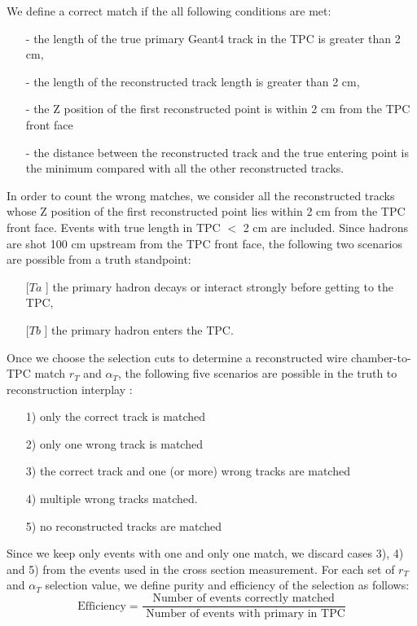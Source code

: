 We define a correct match if the all following conditions are met:
\begin{itemize}
\item[-] the length of the true primary Geant4 track in the TPC is greater than 2 cm,  
\item[-] the length of the reconstructed track length is greater than 2 cm,
\item[-] the Z position of the first reconstructed point is within 2 cm from the TPC front face
\item[-] the distance between the reconstructed track and the true entering point is the minimum compared with all the other reconstructed tracks.
\end{itemize}

In order to count the wrong matches, we consider all the reconstructed tracks whose Z position of the first reconstructed point lies within 2 cm from the TPC front face. Events with true length in TPC $<$ 2 cm are included. 
Since hadrons are shot 100 cm upstream from the TPC front face, the following two scenarios are possible from a truth standpoint: 
\begin{itemize}
\item[[$Ta$]] the primary hadron decays or interact strongly before getting to the TPC,
\item[[$Tb$]] the primary hadron enters the TPC.
\end{itemize}

Once we choose the selection cuts to determine a reconstructed wire chamber-to-TPC match $r_{T}$ and $\alpha_{T}$, the following five scenarios are possible in the truth to reconstruction interplay : 
\begin{itemize}
\item[1)] only the correct track is matched
\item[2)] only one wrong track is matched 
\item[3)] the correct track and one (or more) wrong tracks are matched
\item[4)] multiple wrong tracks  matched.
\item[5)] no reconstructed tracks are matched
\end{itemize}

Since we keep only events with one and only one match, we discard cases 3), 4) and 5) from the events used in the cross section measurement. For each set of $r_{T}$ and $\alpha_{T}$ selection value, we define purity and efficiency of the selection as follows:
\begin{equation}
\text{Efficiency} = \frac{\text{Number of events correctly matched}}{\text{ Number of events with primary in TPC}}
\end{equation}

